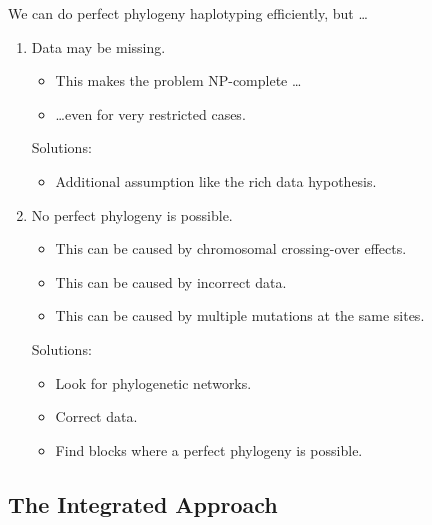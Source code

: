 \documentclass[aspectratio=169]{beamer}
\begin{document}
\begin{frame}{We can do perfect phylogeny haplotyping efficiently, but
    \dots}
  \begin{enumerate}
  \item \alert{Data may be missing.}
    \begin{itemize}
    \item This makes the problem NP-complete \dots
    \item \dots even for very restricted cases.
    \end{itemize}
    \textcolor{green!50!black}{Solutions:}
    \begin{itemize}
    \item Additional assumption like the rich data hypothesis. 
    \end{itemize}
  \item \alert{No perfect phylogeny is possible.}
    \begin{itemize}
    \item This can be caused by chromosomal crossing-over effects.
    \item This can be caused by incorrect data.
    \item This can be caused by multiple mutations at the same sites.
    \end{itemize}
    \textcolor{green!50!black}{Solutions:}
    \begin{itemize}
    \item Look for phylogenetic networks.
    \item Correct data.
    \item<alert@1->
       Find blocks where a perfect phylogeny is possible.
    \end{itemize}
  \end{enumerate}
\end{frame}


\subsection{The Integrated Approach}
\end{document}

